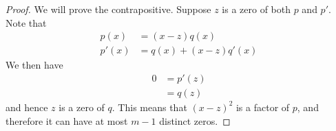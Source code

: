 \documentclass[12pt]{article}
\begin{document}
\begin{proof}
  We will prove the contrapositive.
  Suppose $z$ is a zero of both $p$ and $p'$.
  Note that
  \begin{align*}
    p(x) &= (x-z)q(x)\\
    p'(x) &= q(x) + (x-z)q'(x)
  \end{align*}
  We then have
  \begin{align*}
    0 &= p'(z) \\
    &= q(z)
  \end{align*}
  and hence $z$ is a zero of $q$. 
  This means that $(x-z)^2$ is a factor of $p$, and therefore it can have at most $m-1$ distinct zeros.
\end{proof}
\end{document}
